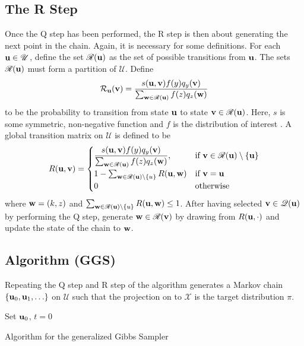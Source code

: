 \subsection{The R Step}
Once the Q step has been performed, the R step is then about generating the next point in the chain. Again, it is necessary for some definitions.
For each $\mathbf{u} \in \mathscr U$, define the set $\mathscr R(\mathbf{u})$ as the set of possible transitions from $\mathbf{u}$. The sets $\mathscr R(\mathbf{u})$ must form a partition of ${\mathscr U}$. 
Define $$\mathcal R_{\mathbf{u}}(\mathbf{v}) = \frac{s(\mathbf{u},\mathbf{v})f(y)q_y(\mathbf{v})}{\sum_{\mathbf{w}\in\mathscr R(\mathbf{u})}f(z)q_z(\mathbf{w})}$$ to be the probability to transition from state $\mathbf{u}$ to state $\mathbf{v}\in\mathscr R(\mathbf{u})$. Here, $s$ is some symmetric, non-negative function and $f$ is the distribution of interest {\color{red}{should I change this to $\pi$ or change the others to $f$?}}. 
A global transition matrix on ${\mathscr U}$ is defined to be
\begin{equation}
		R(\mathbf{u},\mathbf{v}) = 
			\begin{cases}
			\dfrac{s(\mathbf{u},\mathbf{v})f(y)q_y(\mathbf{v})}{\sum_{\mathbf{w}\in\mathscr R(\mathbf{u})}f(z)q_z(\mathbf{w})}, & \text{if } \mathbf{v} \in \mathscr R(\mathbf{u})\setminus\{\mathbf{u}\}\\
			1 - \sum_{\mathbf{w} \in \mathscr R(\mathbf{u})\setminus\mathbf{\{}u\}} R(\mathbf{u},\mathbf{w}) & 
		    \text{if $\mathbf{v} = \mathbf{u}$}\\
			0 & \text{otherwise}\end{cases}
		\end{equation}
	where $\mathbf{w} = (k,z)$ and $\sum_{\mathbf{w} \in \mathscr R(\mathbf{u})\setminus\mathbf{\{}u\}} R(\mathbf{u},\mathbf{w}) \leq 1$.
After having selected $\mathbf{v} \in \mathscr Q(\mathbf{u})$ by performing the Q step, generate $\mathbf{w} \in \mathscr R(\mathbf{v})$ by drawing from $R(\mathbf{u},\cdot)$ and update the state of the chain to $\mathbf{w}$.
\subsection{Algorithm (GGS)}
Repeating the Q step and R step of the algorithm generates a Markov chain $\{\mathbf{u}_0,\mathbf{u}_1,\ldots\}$ on $\mathscr U$ such that the projection on to $\mathscr X$ is the target distribution $\pi$.

\begin{algorithm}[H]
 Set $\mathbf{u}_0$, $t=0$\; 
  \caption{Algorithm for the generalized Gibbs Sampler}
\end{algorithm}


